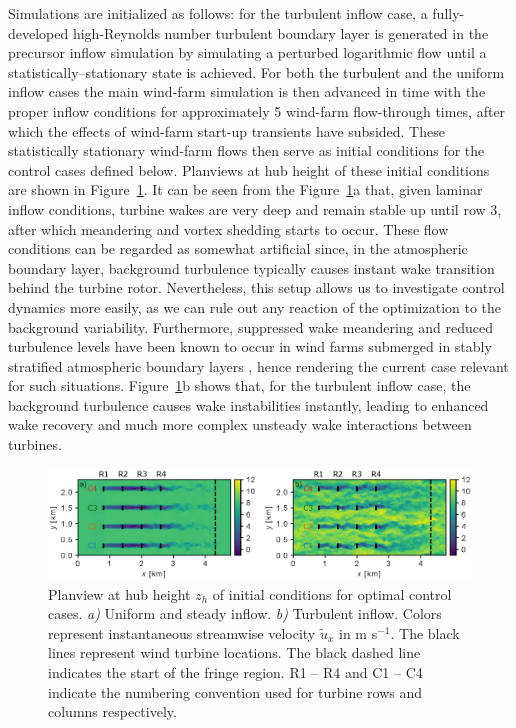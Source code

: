 Simulations are initialized as follows: for the turbulent inflow case, a fully-developed high-Reynolds number turbulent boundary layer is generated in the precursor inflow simulation by simulating a perturbed logarithmic flow until a statistically--stationary state is achieved. For both the turbulent and the uniform inflow cases the main wind-farm simulation is then advanced in time with the proper inflow conditions for approximately 5 wind-farm flow-through times, after which the effects of wind-farm start-up transients have subsided. These statistically stationary wind-farm flows then serve as initial conditions for the control cases defined below. Planviews at hub height of these initial conditions are shown in Figure~\ref{fig:initial_conditions_flow_yaw}. It can be seen from the Figure~\ref{fig:initial_conditions_flow_yaw}a that, given laminar inflow conditions, turbine wakes are very deep and remain stable up until row 3, after which meandering and vortex shedding starts to occur. These flow conditions can be regarded as somewhat artificial since, in the atmospheric boundary layer, background turbulence typically causes instant wake transition behind the turbine rotor. Nevertheless, this setup allows us to investigate control dynamics more easily, as we can rule out any reaction of the optimization to the background variability. Furthermore, suppressed wake meandering and reduced turbulence levels have been known to occur in wind farms submerged in stably stratified atmospheric boundary layers \citep{larsen2009dependence, machefaux2016experimental}, hence rendering the current case relevant for such situations. Figure~\ref{fig:initial_conditions_flow_yaw}b shows that, for the turbulent inflow case, the background turbulence causes wake instabilities instantly, leading to enhanced wake recovery and much more complex unsteady wake interactions between turbines.

\begin{figure}
	\includegraphics[width=\textwidth]{chapters/optimal_yaw_control/domain_rast_RC.eps}
	\caption[Planview at hub height $z_h$ of initial conditions for optimal control cases.]{Planview at hub height $z_h$ of initial conditions for optimal control cases. \emph{a)} Uniform and steady inflow. \emph{b)} Turbulent inflow. Colors represent instantaneous streamwise velocity $\widetilde{u}_x$ in m s$^{-1}$. The black lines represent wind turbine locations. The black dashed line indicates the start of the fringe region. R1 -- R4 and C1 -- C4 indicate the numbering convention used for turbine rows and columns respectively. \label{fig:initial_conditions_flow_yaw}}
\end{figure}

